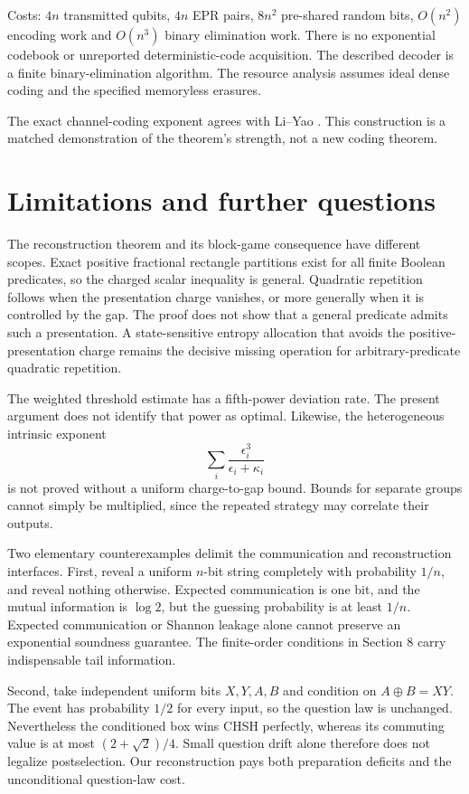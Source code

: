 \documentclass[11pt,reqno]{amsart}
\numberwithin{equation}{section}
\begin{document}
Costs: \(4n\) transmitted qubits, \(4n\) EPR pairs, \(8n^2\) pre-shared random bits, \(O(n^2)\) encoding work and \(O(n^3)\) binary elimination work. There is no exponential codebook or unreported deterministic-code acquisition. The described decoder is a finite binary-elimination algorithm. The resource analysis assumes ideal dense coding and the specified memoryless erasures.

The exact channel-coding exponent agrees with Li--Yao \cite[Theorem 6]{LY}. This construction is a matched demonstration of the theorem's strength, not a new coding theorem.

\section{Limitations and further questions}\label{limitations-and-further-questions}

The reconstruction theorem and its block-game consequence have different scopes. Exact positive fractional rectangle partitions exist for all finite Boolean predicates, so the charged scalar inequality is general. Quadratic repetition follows when the presentation charge vanishes, or more generally when it is controlled by the gap. The proof does not show that a general predicate admits such a presentation. A state-sensitive entropy allocation that avoids the positive-presentation charge remains the decisive missing operation for arbitrary-predicate quadratic repetition.

The weighted threshold estimate has a fifth-power deviation rate. The present argument does not identify that power as optimal. Likewise, the heterogeneous intrinsic exponent \[
 \sum_i\frac{\epsilon_i^3}{\epsilon_i+\kappa_i}
\] is not proved without a uniform charge-to-gap bound. Bounds for separate groups cannot simply be multiplied, since the repeated strategy may correlate their outputs.

Two elementary counterexamples delimit the communication and reconstruction interfaces. First, reveal a uniform \(n\)-bit string completely with probability \(1/n\), and reveal nothing otherwise. Expected communication is one bit, and the mutual information is \(\log2\), but the guessing probability is at least \(1/n\). Expected communication or Shannon leakage alone cannot preserve an exponential soundness guarantee. The finite-order conditions in Section 8 carry indispensable tail information.

Second, take independent uniform bits \(X,Y,A,B\) and condition on \(A\oplus B=XY\). The event has probability \(1/2\) for every input, so the question law is unchanged. Nevertheless the conditioned box wins CHSH perfectly, whereas its commuting value is at most \((2+\sqrt2)/4\). Small question drift alone therefore does not legalize postselection. Our reconstruction pays both preparation deficits and the unconditional question-law cost.
\end{document}
